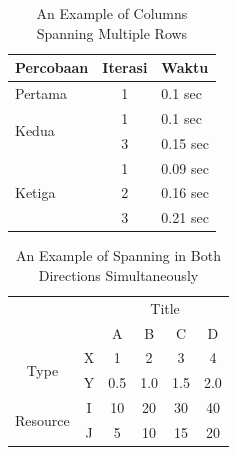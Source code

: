 	\begin{table}
		\centering
		\caption{An Example of Columns Spanning Multiple Rows}
		\label{column.spanning}
		\begin{tabular}{|l|c|l|}
			\hline
			Percobaan               & Iterasi & Waktu    \\
			\hline
			Pertama                 & 1       & 0.1 sec  \\ \hline
			\multirow{2}{*}{Kedua}  & 1       & 0.1 sec  \\
			                        & 3       & 0.15 sec \\
			\hline
			\multirow{3}{*}{Ketiga} & 1       & 0.09 sec \\
			                        & 2       & 0.16 sec \\
			                        & 3       & 0.21 sec \\
			\hline
		\end{tabular}
	\end{table}

	\begin{table}
		\centering
		\caption{An Example of Spanning in Both Directions Simultaneously}
		\label{mix.spanning}
		\begin{tabular}{cc|c|c|c|c|}
			\cline{3-6}
			                                                &     & \multicolumn{4}{|c|}{Title}                 \\ \cline{3-6}
			                                                &     & A                           & B   & C   & D \\ \hline
			\multicolumn{1}{|c|}{\multirow{2}{*}{Type}}     &
			\multicolumn{1}{|c|}{X}                         & 1   & 2                           & 3   & 4       \\ \cline{2-6}
			\multicolumn{1}{|c|}{}                          &
			\multicolumn{1}{|c|}{Y}                         & 0.5 & 1.0                         & 1.5 & 2.0     \\ \cline{1-6}
			\multicolumn{1}{|c|}{\multirow{2}{*}{Resource}} &
			\multicolumn{1}{|c|}{I}                         & 10  & 20                          & 30  & 40      \\ \cline{2-6}
			\multicolumn{1}{|c|}{}                          &
			\multicolumn{1}{|c|}{J}                         & 5   & 10                          & 15  & 20      \\ \cline{1-6}
		\end{tabular}
	\end{table}
\fi



